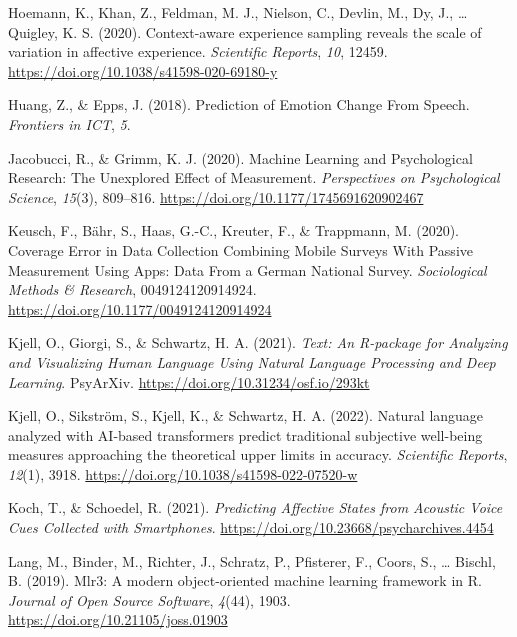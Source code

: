 \documentclass[
  english,
  man,floatsintext]{apa6}
\newlength{\cslhangindent}
\newenvironment{CSLReferences}[2] %
 {%
  \setlength{\parindent}{0pt}
  \ifodd #1 \everypar{\setlength{\hangindent}{\cslhangindent}}\ignorespaces\fi
  \ifnum #2 > 0
  \setlength{\parskip}{#2\baselineskip}
  \fi
 }%
 {}
\begin{document}
\begin{CSLReferences}{1}{0}
\leavevmode{}%
Hoemann, K., Khan, Z., Feldman, M. J., Nielson, C., Devlin, M., Dy, J., \ldots{} Quigley, K. S. (2020). Context-aware experience sampling reveals the scale of variation in affective experience. \emph{Scientific Reports}, \emph{10}, 12459. \url{https://doi.org/10.1038/s41598-020-69180-y}

\leavevmode{}%
Huang, Z., \& Epps, J. (2018). Prediction of {Emotion Change From Speech}. \emph{Frontiers in ICT}, \emph{5}.

\leavevmode{}%
Jacobucci, R., \& Grimm, K. J. (2020). Machine {Learning} and {Psychological Research}: {The Unexplored Effect} of {Measurement}. \emph{Perspectives on Psychological Science}, \emph{15}(3), 809--816. \url{https://doi.org/10.1177/1745691620902467}

\leavevmode{}%
Keusch, F., Bähr, S., Haas, G.-C., Kreuter, F., \& Trappmann, M. (2020). Coverage {Error} in {Data Collection Combining Mobile Surveys With Passive Measurement Using Apps}: {Data From} a {German National Survey}. \emph{Sociological Methods \& Research}, 0049124120914924. \url{https://doi.org/10.1177/0049124120914924}

\leavevmode{}%
Kjell, O., Giorgi, S., \& Schwartz, H. A. (2021). \emph{Text: {An R-package} for {Analyzing} and {Visualizing Human Language Using Natural Language Processing} and {Deep Learning}}. PsyArXiv. \url{https://doi.org/10.31234/osf.io/293kt}

\leavevmode{}%
Kjell, O., Sikström, S., Kjell, K., \& Schwartz, H. A. (2022). Natural language analyzed with {AI-based} transformers predict traditional subjective well-being measures approaching the theoretical upper limits in accuracy. \emph{Scientific Reports}, \emph{12}(1), 3918. \url{https://doi.org/10.1038/s41598-022-07520-w}

\leavevmode{}%
Koch, T., \& Schoedel, R. (2021). \emph{Predicting {Affective States} from {Acoustic Voice Cues Collected} with {Smartphones}}. \url{https://doi.org/10.23668/psycharchives.4454}

\leavevmode{}%
Lang, M., Binder, M., Richter, J., Schratz, P., Pfisterer, F., Coors, S., \ldots{} Bischl, B. (2019). Mlr3: {A} modern object-oriented machine learning framework in {R}. \emph{Journal of Open Source Software}, \emph{4}(44), 1903. \url{https://doi.org/10.21105/joss.01903}


\end{CSLReferences}
\end{document}
